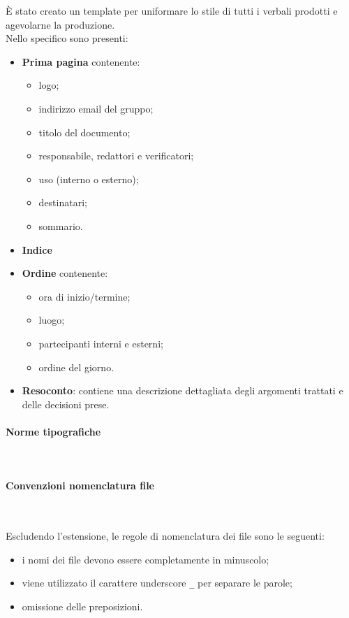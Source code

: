 È stato creato un template per uniformare lo stile di tutti i verbali prodotti e agevolarne la produzione.\\
Nello specifico sono presenti:
\begin{itemize}
    \item \textbf{Prima pagina} contenente:
          \begin {itemize}
    \item logo;
    \item indirizzo email del gruppo;
    \item titolo del documento;
    \item responsabile, redattori e verificatori;
    \item uso (interno o esterno);
    \item destinatari;
    \item sommario.
\end{itemize}
\item \textbf{Indice}
\item \textbf{Ordine} contenente:
\begin {itemize}
\item ora di inizio/termine;
\item luogo;
\item partecipanti interni e esterni;
\item ordine del giorno.
\end{itemize}
\item \textbf{Resoconto}: contiene una descrizione dettagliata degli argomenti trattati e delle decisioni prese.
\end{itemize}

\paragraph{Norme tipografiche} ~

\paragraph{Convenzioni nomenclatura file} ~

Escludendo l'estensione, le regole di nomenclatura dei file sono le seguenti:
\begin{itemize}
    \item i nomi dei file devono essere completamente in minuscolo;
    \item viene utilizzato il carattere underscore \texttt{\_} per separare le parole;
    \item omissione delle preposizioni.
\end{itemize}

